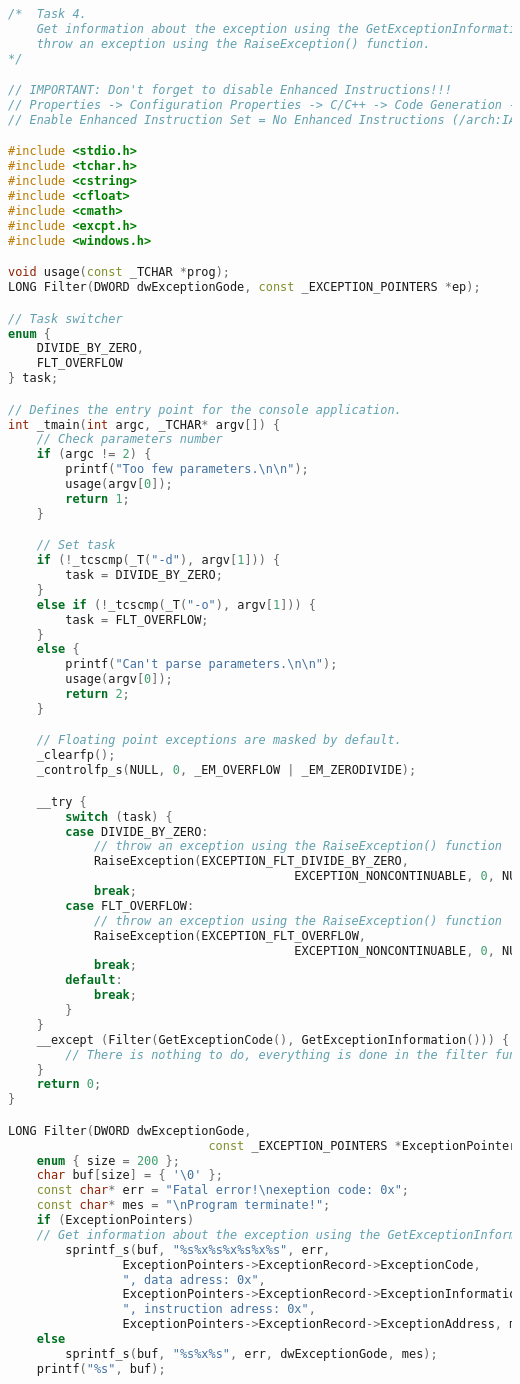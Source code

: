 \documentclass[a4paper,12pt]{article} %
\begin{document}
\begin{lstlisting}[language=C++, caption={Программная генерация исключения при помощи функции RaiseException}]
/*  Task 4.
	Get information about the exception using the GetExceptionInformation() fnc;
	throw an exception using the RaiseException() function.
*/

// IMPORTANT: Don't forget to disable Enhanced Instructions!!!
// Properties -> Configuration Properties -> C/C++ -> Code Generation ->
// Enable Enhanced Instruction Set = No Enhanced Instructions (/arch:IA32)

#include <stdio.h>
#include <tchar.h>
#include <cstring>
#include <cfloat>
#include <cmath>
#include <excpt.h>
#include <windows.h>

void usage(const _TCHAR *prog);
LONG Filter(DWORD dwExceptionGode, const _EXCEPTION_POINTERS *ep);

// Task switcher
enum {
	DIVIDE_BY_ZERO,
	FLT_OVERFLOW
} task;

// Defines the entry point for the console application.
int _tmain(int argc, _TCHAR* argv[]) {
	// Check parameters number
	if (argc != 2) {
		printf("Too few parameters.\n\n");
		usage(argv[0]);
		return 1;
	}

	// Set task
	if (!_tcscmp(_T("-d"), argv[1])) {
		task = DIVIDE_BY_ZERO;
	}
	else if (!_tcscmp(_T("-o"), argv[1])) {
		task = FLT_OVERFLOW;
	}
	else {
		printf("Can't parse parameters.\n\n");
		usage(argv[0]);
		return 2;
	}

	// Floating point exceptions are masked by default.
	_clearfp();
	_controlfp_s(NULL, 0, _EM_OVERFLOW | _EM_ZERODIVIDE);

	__try {
		switch (task) {
		case DIVIDE_BY_ZERO:
			// throw an exception using the RaiseException() function
			RaiseException(EXCEPTION_FLT_DIVIDE_BY_ZERO, 
										EXCEPTION_NONCONTINUABLE, 0, NULL);
			break;
		case FLT_OVERFLOW:
			// throw an exception using the RaiseException() function
			RaiseException(EXCEPTION_FLT_OVERFLOW,
										EXCEPTION_NONCONTINUABLE, 0, NULL);
			break;
		default:
			break;
		}
	}
	__except (Filter(GetExceptionCode(), GetExceptionInformation())) {
		// There is nothing to do, everything is done in the filter function.
	}
	return 0;
}

LONG Filter(DWORD dwExceptionGode, 
							const _EXCEPTION_POINTERS *ExceptionPointers) {
	enum { size = 200 };
	char buf[size] = { '\0' };
	const char* err = "Fatal error!\nexeption code: 0x";
	const char* mes = "\nProgram terminate!";
	if (ExceptionPointers)
	// Get information about the exception using the GetExceptionInformation
		sprintf_s(buf, "%s%x%s%x%s%x%s", err, 
				ExceptionPointers->ExceptionRecord->ExceptionCode,
				", data adress: 0x", 
				ExceptionPointers->ExceptionRecord->ExceptionInformation[1],
				", instruction adress: 0x",
				ExceptionPointers->ExceptionRecord->ExceptionAddress, mes);
	else
		sprintf_s(buf, "%s%x%s", err, dwExceptionGode, mes);
	printf("%s", buf);


\end{lstlisting}
\end{document}
